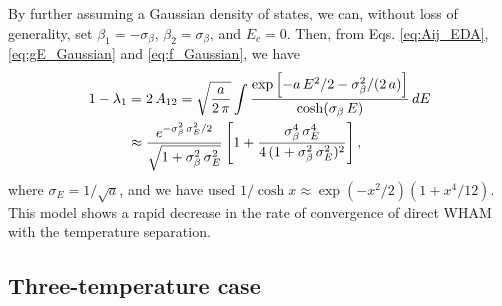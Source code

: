 \documentclass{gMOS2e}
\begin{document}
By further assuming a Gaussian density of states,
we can, without loss of generality,
 set
$\beta_1 = -\sigma_\beta$,
$\beta_2 = \sigma_\beta$,
and $E_c = 0$.
%
Then, from
Eqs. \eqref{eq:Aij_EDA},
\eqref{eq:gE_Gaussian}
and \eqref{eq:f_Gaussian},
we have
%
\begin{align}
1 - \lambda_1
&= 2 \, A_{12}
=
\sqrt \frac{ a } { 2 \, \pi }
\int
\frac
{
  \exp\left[
    -a \, E^2/2
    -\sigma_\beta^2 / (2 \, a)
  \right]
}
{ \cosh( \sigma_\beta \, E ) }
\, dE
\notag \\
%
&\approx\frac{ e^{-\sigma_\beta^2 \, \sigma_E^2/2} }
{ \sqrt{ 1 + \sigma_\beta^2 \, \sigma_E^2 } }
\left[
  1 + \frac{ \sigma_\beta^4 \, \sigma_E^4 }
  {4\,(1 + \sigma_\beta^2 \, \sigma_E^2)^2 }
\right],
\label{eq:lambda1_twoT}
\end{align}
%
where
$\sigma_E = 1/\sqrt{a}$,
%
and we have used
$1/\cosh x \approx \exp(-x^2/2)(1 + x^4/12)$.
%
This model shows
a rapid decrease in
the rate of convergence of direct WHAM
with the temperature separation.



\subsection{Three-temperature case}
\end{document}
